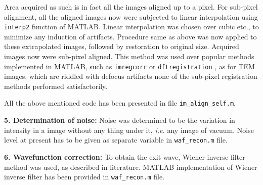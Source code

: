 Area acquired as such is in fact all the images aligned up to a pixel.
For sub-pixel alignment, all the aligned images now were subjected to linear interpolation using \texttt{interp2} function of MATLAB.
Linear interpolation was chosen over cubic etc.\@, to minimize any induction of artifacts.
Procedure same as above was now applied to these extrapolated images, followed by restoration to original size.
Acquired images now were sub-pixel aligned.
This method was used over popular methods implemented in MATLAB, such as \texttt{imregcorr} or \texttt{dftregistration} \cite{Guizar-Sicairos:08}, as for TEM images, which are riddled with defocus artifacts none of the sub-pixel registration methods performed satisfactorily.

All the above mentioned code has been presented in file \texttt{im\_align\_self.m}.

\textbf{5. Determination of noise:}
Noise was determined to be the variation in intensity in a image without any thing under it, \textit{i.e.\@} any image of vacuum.
Noise level at present has to be given as separate variable in \texttt{waf\_recon.m} file.

\textbf{6. Wavefunction correction:}
To obtain the exit wave, Wiener inverse filter method was used, as described in literature. \cite{meyer_symmetric}
MATLAB implementation of Wiener inverse filter has been provided in \texttt{waf\_recon.m} file.
